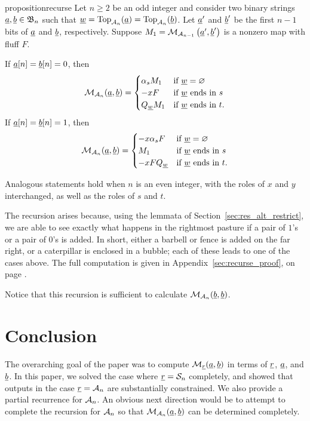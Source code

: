 \begin{restatable}{proposition}{recurse}
	Let $n \ge 2$ be an odd integer and consider two binary strings $\ul a, \ul b \in \BB_n$ such that $\ul w = \Top_{\AA_n}(\ul a) = \Top_{\AA_n}(\ul b)$.  
	Let $\ul a'$ and $\ul b'$ be the first $n-1$ bits of $\ul a$ and $\ul b$, respectively. 
	Suppose $M_1 = \MM_{\AA_{n-1}} \left(\ul a', \ul b'\right)$ is a nonzero map with fluff $F$.
	\begin{enumerate}[(i)]
		\ii If $\ul a[n] = \ul b[n] = 0$, then
		\[ \MM_{\AA_n} (\ul a, \ul b)
			=
			\begin{cases}
				\alpha_s M_1 & \text{if $\ul w = \varnothing$} \\ %
				-xF & \text{if $\ul w$ ends in $s$} \\ %
				Q_{\ul w} M_1 & \text{if $\ul w$ ends in $t$}. \\ %
			\end{cases}
		\]
		\ii If $\ul a[n] = \ul b[n] = 1$, then
		\[
			\MM_{\AA_n} (\ul a, \ul b)
			=
			\begin{cases}
				-x\alpha_sF & \text{if $\ul w = \varnothing$} \\ %
				M_1 & \text{if $\ul w$ ends in $s$} \\ %
				-xF Q_{\ul w} & \text{if $\ul w$ ends in $t$}. %
			\end{cases}
		\]
	\end{enumerate}
	Analogous statements hold when $n$ is an even integer, with the roles of $x$ and $y$ interchanged, as well as the roles of $s$ and $t$.
	\label{thm:recurse}
\end{restatable}
The recursion arises because, using the lemmata of Section~\ref{sec:res_alt_restrict}, we are able to see exactly what happens in the rightmost pasture if a pair of $1$'s or a pair of $0$'s is added.  In short, either a barbell or fence is added on the far right, or a caterpillar is enclosed in a bubble; each of these leads to one of the cases above.  The full computation is given in Appendix~\ref{sec:recurse_proof}, on page \pageref{sec:recurse_proof}.

Notice that this recursion is sufficient to calculate $\MM_{\AA_n}(\ul b, \ul b)$.


\section{Conclusion}
The overarching goal of the paper was to compute $\MM_{\ul r} (\ul a, \ul b)$ in terms of $\ul r$, $\ul a$, and $\ul b$.  In this paper, we solved the case where $\ul r = \SS_n$ completely, and showed that outputs in the case $\ul r = \AA_n$ are substantially constrained.  We also provide a partial recurrence for $\AA_n$.  An obvious next direction would be to attempt to complete the recursion for $\AA_n$ so that $\MM_{\AA_n} (\ul a, \ul b)$ can be determined completely.

